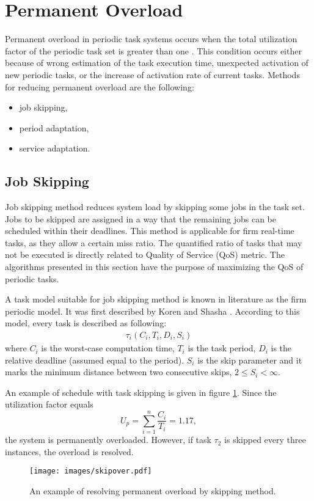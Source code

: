 \section{Permanent Overload}

Permanent overload in periodic task systems occurs when the total utilization factor of the periodic task set is greater than one \cite{buttazzo2011hard}. 
This condition occurs either because of wrong estimation of the task execution time, unexpected activation of new periodic tasks, or the increase of activation rate of current tasks.
Methods for reducing permanent overload are the following:
\begin{itemize}
	\item{job skipping,}
	\item{period adaptation,}
	\item{service adaptation.}
\end{itemize}

\subsection{Job Skipping}
Job skipping method reduces system load by skipping some jobs in the task set. Jobs to be skipped are assigned in a way that the remaining jobs can be scheduled within their deadlines.
This method is applicable for firm real-time tasks, as they allow a certain miss ratio. 
The quantified ratio of tasks that may not be executed is directly related to Quality of Service 
(QoS) metric. 
The algorithms presented in this section have the purpose of maximizing the QoS of periodic tasks.

A task model suitable for job skipping method is known in literature as the firm periodic model.
It was first described by Koren and Shasha \cite{koren1995skip}.
According to this model, every task is described as following:
\begin{align*}
\tau_i(C_i, T_i, D_i, S_i)
\end{align*}
where $C_i$ is the worst-case computation time, $T_i$ is the task period, $D_i$ is the relative deadline (assumed equal to the period). $S_i$ is the skip parameter and it marks the minimum distance between two consecutive skips, \(2 \leq S_i < \infty\).

An example of schedule with task skipping is given in figure \ref{skipover}. 
Since the utilization factor equals 
\begin{equation*}
U_p = \sum_{i=1}^{n} \frac{C_i}{T_i} = 1.17,
\end{equation*}
the system is permanently overloaded. 
However, if task \(\tau_2\) is skipped every three instances, the overload is resolved.
\\
\begin{figure}[ht]
    \centering
    \texttt{[image: images/skipover.pdf]}
    \caption{An example of resolving permanent overload by skipping method.}
    \label{skipover}
\end{figure}

